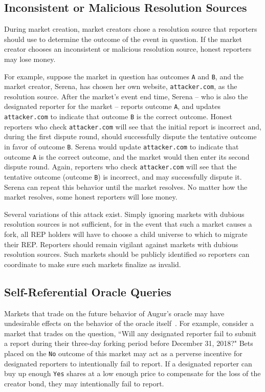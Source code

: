 \documentclass[floatfix,reprint,nofootinbib,amsmath,amssymb,epsfig,pre,floats,letterpaper,groupedaffiliation]{revtex4-1}
\theoremstyle{definition}
\theoremstyle{definition}
\begin{document}
\subsection{Inconsistent or Malicious Resolution Sources}

During market creation, market creators chose a resolution source that reporters should use to determine the outcome of the event in question.  If the market creator chooses an inconsistent or malicious resolution source, honest reporters may lose money.

For example, suppose the market in question has outcomes \texttt{A} and \texttt{B}, and the market creator, Serena, has chosen her own website, \texttt{attacker.com}, as the resolution source.  After the market's event end time, Serena -- who is also the designated reporter for the market -- reports outcome \texttt{A}, and updates \texttt{attacker.com} to indicate that outcome \texttt{B} is the correct outcome.  Honest reporters who check \texttt{attacker.com} will see that the initial report is incorrect and, during the first dispute round, should successfully dispute the tentative outcome in favor of outcome \texttt{B}.  Serena would update \texttt{attacker.com} to indicate that outcome \texttt{A} is the correct outcome, and the market would then enter its second dispute round.  Again, reporters who check \texttt{attacker.com} will see that the tentative outcome (outcome \texttt{B}) is incorrect, and may successfully dispute it.  Serena can repeat this behavior until the market resolves.  No matter how the market resolves, some honest reporters will lose money.

Several variations of this attack exist.  Simply ignoring markets with dubious resolution sources is not sufficient, for in the event that such a market causes a fork, all REP holders will have to choose a child universe to which to migrate their REP.  Reporters should remain vigilant against markets with dubious resolution sources.  Such markets should be publicly identified so reporters can coordinate to make sure such markets finalize as invalid.

\subsection{Self-Referential Oracle Queries}

Markets that trade on the future behavior of Augur's oracle may have undesirable effects on the behavior of the oracle itself~\cite{Othman_2010}.  For example, consider a market that trades on the question, ``Will any designated reporter fail to submit a report during their three-day forking period before December 31, 2018?"  Bets placed on the \texttt{No} outcome of this market may act as a perverse incentive for designated reporters to intentionally fail to report.  If a designated reporter can buy up enough \texttt{Yes} shares at a low enough price to compensate for the loss of the creator bond, they may intentionally fail to report.
\end{document}
